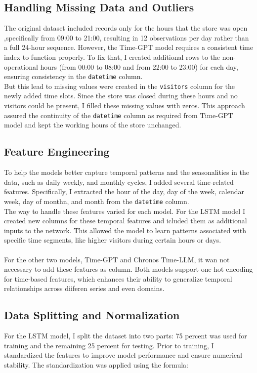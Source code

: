 \documentclass{article}
\begin{document}
\subsection{Handling Missing Data and Outliers}
The original dataset included records only for the hours that the store was open ,specifically from 09:00 to 21:00, resulting in 12 observations per day rather than a full 24-hour sequence. However, the Time-GPT model requires a consistent time index to function properly. To fix that, I created additional rows to the non-operational hours (from 00:00 to 08:00 and from 22:00 to 23:00) for each day, ensuring consistency in the \texttt{datetime} column.\\
But this lead to missing values were created in the \texttt{visitors} column for the newly added time slots. Since the store was closed during these hours and no visitors could be present, I filled these missing values with zeros. This approach assured the continuity of the \texttt{datetime} column as required from Time-GPT model and kept the working hours of the store unchanged.

\subsection{Feature Engineering}
To help the models better capture temporal patterns and the seasonalities in the data, such as daily weekly, and monthly cycles, I added several time-related features. Specifically, I extracted the hour of the day, day of the week, calendar week, day of monthn, and month from the \texttt{datetime} column.
\\
The way to handle these features varied for each model. For the LSTM model I created
new columns for these temporal features and icluded them as additional inputs to the network. This allowed the model to learn patterns associated with specific time segments, like higher visitors during certain hours or days.\\
\\
For the other two models, Time-GPT and Chronos Time-LLM, it wan not necessary to add these features as column. Both models support one-hot encoding for time-based features, which enhances their ability to generalize temporal relationships across diiferen series and even domains.

\subsection{Data Splitting and Normalization}
For the LSTM model, I split the dataset into two parts: 75 percent was used for training and the remaining 25 percent for testing. Prior to training, I standardized the features to improve model performance and ensure numerical stability. The standardization was applied using the formula:
\end{document}
